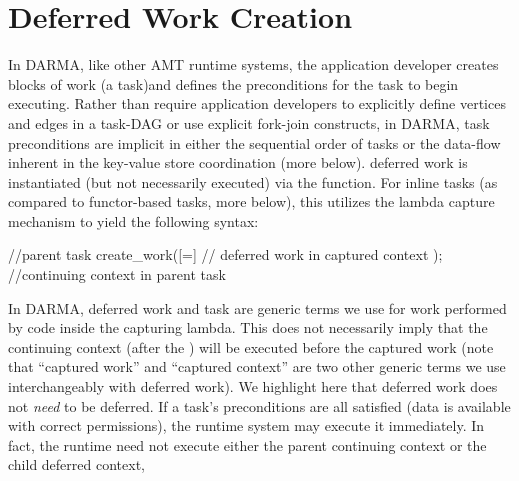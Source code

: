 \section{Deferred Work Creation}
\label{sec:deferred}
In \gls{DARMA}, like other \gls{AMT} \glspl{runtime system}, 
the application developer creates blocks of work (a \gls{task})and defines the
\glspl{precondition} for the \gls{task} to begin executing.
Rather than require application developers to explicitly define vertices and
edges in a \gls{task-DAG} or use explicit \gls{fork-join} constructs,
in \gls{DARMA}, \gls{task} \glspl{precondition} are implicit in either the sequential 
order of \glspl{task} or the data-flow inherent in the \gls{key-value store}
coordination (more below).
\Gls{deferred work} is instantiated (but not necessarily executed) via the  function. 
For inline \glspl{task} (as compared to functor-based \glspl{task}, more
below), this utilizes the \CC{} \gls{lambda} \gls{capture} mechanism to yield the following syntax:

\begin{CppCode}
//parent task
create_work([=]{
  // deferred work in captured context
});
//continuing context in parent task
\end{CppCode}

In \gls{DARMA}, \gls{deferred work} and \gls{task} are generic terms we use for work
performed by code inside the capturing \gls{lambda}.
This does not necessarily imply that the \gls{continuing context} (after the ) will be
executed before the \gls{captured work} (note that ``\gls{captured work}'' and
``\gls{captured context}'' are two other generic terms we use interchangeably
with \gls{deferred work}).  
We highlight here that \gls{deferred work} does not \emph{need} to be deferred.
If a \gls{task}'s \glspl{precondition} are all satisfied (data is available with correct permissions),
the \gls{runtime system} may execute it immediately.  
In fact, the runtime need not execute either the parent continuing context or the child deferred context,

